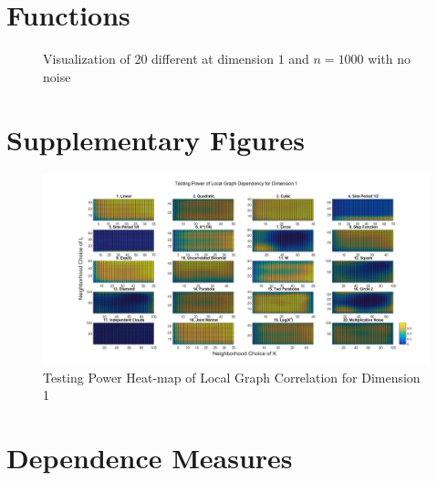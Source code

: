 \documentclass[11pt]{article}
\begin{document}
\appendix

\section{Functions}

\begin{figure}[htbp]
\caption{Visualization of 20 different at dimension $1$ and $n=1000$ with no noise}
\label{fig0}
\end{figure}


\section{Supplementary Figures}
\begin{figure}[htbp]
\includegraphics[width=1.0\textwidth]{../Figures/Fig2s}
\caption{Testing Power Heat-map of Local Graph Correlation for Dimension 1}
\label{figSim2}
\end{figure}


\section{Dependence Measures}
\label{main}
\end{document}
